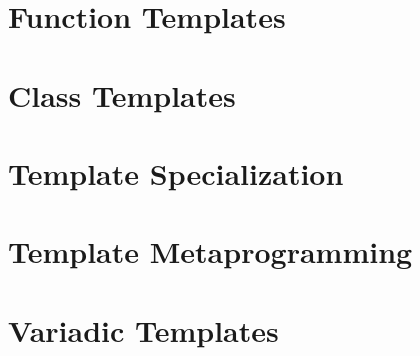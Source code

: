 \documentclass{article}
\title{}
\author{Ryan Baker}
\date{\today}
\begin{document}
\maketitle
\tableofcontents
\pagebreak

\section{Function Templates}

\section{Class Templates}

\section{Template Specialization}

\section{Template Metaprogramming}

\section{Variadic Templates}
\end{document}
